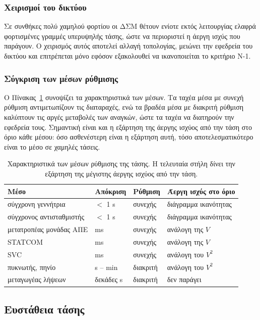 \subsubsection{Χειρισμοί του δικτύου}

Σε συνθήκες πολύ χαμηλού φορτίου οι ΔΣΜ θέτουν ενίοτε εκτός λειτουργίας ελαφρά φορτισμένες
γραμμές υπερυψηλής τάσης, ώστε να περιοριστεί η άεργη ισχύς που παράγουν. Ο χειρισμός αυτός
αποτελεί αλλαγή τοπολογίας, μειώνει την εφεδρεία του δικτύου και επιτρέπεται μόνο εφόσον
εξακολουθεί να ικανοποιείται το κριτήριο N-1.

\subsubsection{Σύγκριση των μέσων ρύθμισης}

Ο Πίνακας~\ref{tab:v-means} συνοψίζει τα χαρακτηριστικά των μέσων. Τα ταχέα μέσα με συνεχή
ρύθμιση αντιμετωπίζουν τις διαταραχές, ενώ τα βραδέα μέσα με διακριτή ρύθμιση καλύπτουν τις
αργές μεταβολές των αναγκών, ώστε τα ταχέα να διατηρούν την εφεδρεία τους. Σημαντική είναι και
η εξάρτηση της άεργης ισχύος από την τάση στο όριο κάθε μέσου: όσο ασθενέστερη είναι η
εξάρτηση αυτή, τόσο αποτελεσματικότερο είναι το μέσο σε χαμηλές τάσεις.

\begin{table}[!htbp]
\centering
\begin{tabular}{llll}
\hline
Μέσο & Απόκριση & Ρύθμιση & Άεργη ισχύς στο όριο \\
\hline
σύγχρονη γεννήτρια & $<$ 1 s & συνεχής & διάγραμμα ικανότητας \\
σύγχρονος αντισταθμιστής & $<$ 1 s & συνεχής & διάγραμμα ικανότητας \\
μετατροπέας μονάδας ΑΠΕ & ms & συνεχής & ανάλογη της $V$ \\
STATCOM & ms & συνεχής & ανάλογη της $V$ \\
SVC & ms & συνεχής & ανάλογη του $V^2$ \\
πυκνωτής, πηνίο & s -- min & διακριτή & ανάλογη του $V^2$ \\
μεταγωγέας λήψεων & δεκάδες s & διακριτή & δεν παράγει \\
\hline
\end{tabular}
\caption{Χαρακτηριστικά των μέσων ρύθμισης της τάσης. Η τελευταία στήλη δίνει την εξάρτηση της
μέγιστης άεργης ισχύος από την τάση.}
\label{tab:v-means}
\end{table}

\subsection{Ευστάθεια τάσης}
\label{sec:v-stability}

